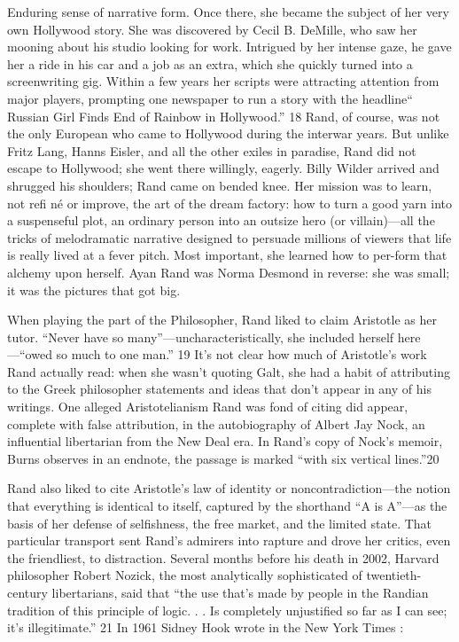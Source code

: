 Enduring sense of narrative form. Once there, she became the subject of her very own Hollywood story. She was discovered by Cecil B. DeMille, who saw her mooning about his studio looking for work. Intrigued by her intense gaze, he gave her a ride in his car and a job as an extra, which she quickly turned into a screenwriting gig. Within a few years her scripts were attracting attention from major players, prompting one newspaper to run a story with the headline“ Russian Girl Finds End of Rainbow in Hollywood.” {\color{blue}18} Rand, of course, was not the only European who came to Hollywood during the interwar years. But unlike Fritz Lang, Hanns Eisler, and all the other exiles in paradise, Rand did not escape to Hollywood; she went there willingly, eagerly. Billy Wilder arrived and shrugged his shoulders; Rand came on bended knee. Her mission was to learn, not refi né or improve, the art of the dream factory: how to turn a good yarn into a suspenseful plot, an ordinary person into an outsize hero (or villain)—all the tricks of melodramatic narrative designed to persuade millions of viewers that life is really lived at a fever pitch. Most important, she learned how to per-form that alchemy upon herself. Ayan Rand was Norma Desmond in reverse: she was small; it was the pictures that got big.
 \par 
When playing the part of the Philosopher, Rand liked to claim Aristotle as her tutor. “Never have so many”—uncharacteristically, she included herself here—“owed so much to one man.” {\color{blue}19} It’s not clear how much of Aristotle’s work Rand actually read: when she wasn’t quoting Galt, she had a habit of attributing to the Greek philosopher statements and ideas that don’t appear in any of his writings. One alleged Aristotelianism Rand was fond of citing did appear, complete with false attribution, in the autobiography of Albert Jay Nock, an influential libertarian from the New Deal era. In Rand’s copy of Nock’s memoir, Burns observes in an endnote, the passage is marked “with six vertical lines.”{\color{blue}20}
 \par 
Rand also liked to cite Aristotle’s law of identity or noncontradiction—the notion that everything is identical to itself, captured by the shorthand “A is A”—as the basis of her defense of selfishness, the free market, and the limited state. That particular transport sent Rand’s admirers into rapture and drove her critics, even the friendliest, to distraction. Several months before his death in 2002, Harvard philosopher Robert Nozick, the most analytically sophisticated of twentieth-century libertarians, said that “the use that’s made by people in the Randian tradition of this principle of logic. . . Is completely unjustified so far as I can see; it’s illegitimate.” {\color{blue}21} In 1961 Sidney Hook wrote in the New York Times :

